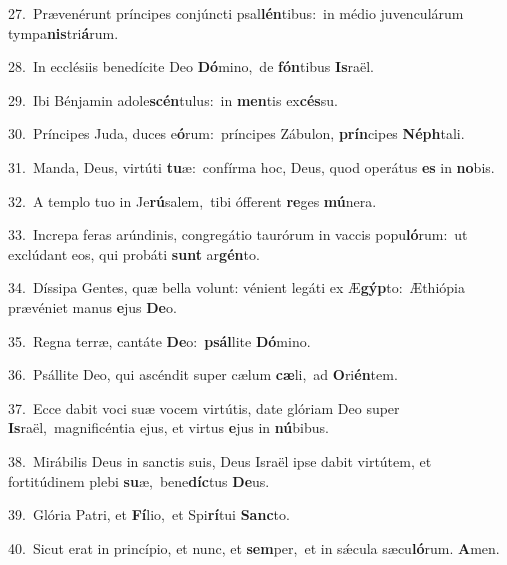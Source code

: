 {\numbfont\textcolor{\numbcolor}{27.}}~Prævenérunt príncipes conjúncti psal\-\textbf{lén}\-tibus:~\star in médio juvenculárum tympa\-\textbf{nis}\-tri\-\textbf{á}\-rum.\par
{\numbfont\textcolor{\numbcolor}{28.}}~In ecclésiis benedícite Deo \textbf{Dó}\-mino,~\star de \textbf{fón}\-tibus \textbf{Is}\-raël.\par
{\numbfont\textcolor{\numbcolor}{29.}}~Ibi Bénjamin adole\-\textbf{scén}\-tulus:~\star in \textbf{men}\-tis ex\-\textbf{cés}\-su.\par
{\numbfont\textcolor{\numbcolor}{30.}}~Príncipes Juda, duces e\-\textbf{ó}\-rum:~\star príncipes Zábulon, \textbf{prín}\-cipes \textbf{Néph}\-tali.\par
{\numbfont\textcolor{\numbcolor}{31.}}~Manda, Deus, virtúti \textbf{tu}\-æ:~\star confírma hoc, Deus, quod operátus \textbf{es} in \textbf{no}\-bis.\par
{\numbfont\textcolor{\numbcolor}{32.}}~A templo tuo in Je\-\textbf{rú}\-salem,~\star tibi ófferent \textbf{re}\-ges \textbf{mú}\-nera.\par
{\numbfont\textcolor{\numbcolor}{33.}}~Increpa feras arúndinis, congregátio taurórum in vaccis popu\-\textbf{ló}\-rum:~\star ut exclúdant eos, qui probáti \textbf{sunt} ar\-\textbf{gén}\-to.\par
{\numbfont\textcolor{\numbcolor}{34.}}~Díssipa Gentes, quæ bella volunt: vénient legáti ex Æ\-\textbf{gýp}\-to:~\star Æthiópia prævéniet manus \textbf{e}\-jus \textbf{De}\-o.\par
{\numbfont\textcolor{\numbcolor}{35.}}~Regna terræ, cantáte \textbf{De}\-o:~\star \textbf{psál}\-lite \textbf{Dó}\-mino.\par
{\numbfont\textcolor{\numbcolor}{36.}}~Psállite Deo, qui ascéndit super cælum \textbf{cæ}\-li,~\star ad \textbf{O}\-ri\-\textbf{én}\-tem.\par
{\numbfont\textcolor{\numbcolor}{37.}}~Ecce dabit voci suæ vocem virtútis, date glóriam Deo super \textbf{Is}\-raël,~\star magnificéntia ejus, et virtus \textbf{e}\-jus in \textbf{nú}\-bibus.\par
{\numbfont\textcolor{\numbcolor}{38.}}~Mirábilis Deus in sanctis suis, Deus Israël ipse dabit virtútem, et fortitúdinem plebi \textbf{su}\-æ,~\star bene\-\textbf{díc}\-tus \textbf{De}\-us.\par
{\numbfont\textcolor{\numbcolor}{39.}}~Glória Patri, et \textbf{Fí}\-lio,~\star et Spi\-\textbf{rí}\-tui \textbf{Sanc}\-to.\par
{\numbfont\textcolor{\numbcolor}{40.}}~Sicut erat in princípio, et nunc, et \textbf{sem}\-per,~\star et in sǽcula sæcu\-\textbf{ló}\-rum. \textbf{A}\-men.\par
